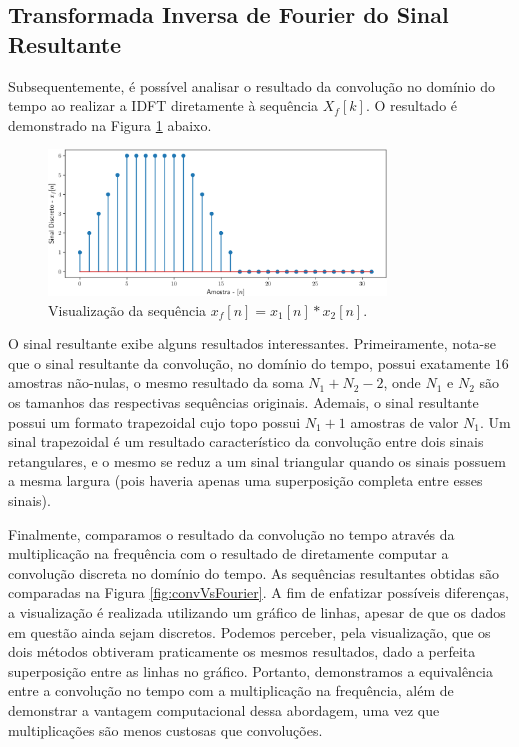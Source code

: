 \documentclass[a4paper,11pt]{article}
\numberwithin{figure}{section}
\numberwithin{equation}{section}
\numberwithin{table}{section}
\theoremstyle{definition}
\begin{document}
\subsection{Transformada Inversa de Fourier do Sinal Resultante}

Subsequentemente, é possível analisar o resultado da convolução no domínio do tempo ao realizar a IDFT diretamente à sequência $X_f[k]$. O resultado é demonstrado na Figura \ref{fig:trapez} abaixo.

\begin{figure}[ht] \centering
	\includegraphics[width=0.8\textwidth]{trapez}
	\caption{Visualização da sequência $x_f[n] = x_1[n] * x_2[n]$.}
	\label{fig:trapez}
\end{figure}

O sinal resultante exibe alguns resultados interessantes. Primeiramente, nota-se que o sinal resultante da convolução, no domínio do tempo, possui exatamente $16$ amostras não-nulas, o mesmo resultado da soma $N_1 + N_2 - 2$, onde $N_1$ e $N_2$ são os tamanhos das respectivas sequências originais. Ademais, o sinal resultante possui um formato trapezoidal cujo topo possui $N_1+1$ amostras de valor $N_1$. Um sinal trapezoidal é um resultado característico da convolução entre dois sinais retangulares, e o mesmo se reduz a um sinal triangular quando os sinais possuem a mesma largura (pois haveria apenas uma superposição completa entre esses sinais).

Finalmente, comparamos o resultado da convolução no tempo através da multiplicação na frequência com o resultado de diretamente computar a convolução discreta no domínio do tempo. As sequências resultantes obtidas são comparadas na Figura \ref{fig:convVsFourier}. A fim de enfatizar possíveis diferenças, a visualização é realizada utilizando um gráfico de linhas, apesar de que os dados em questão ainda sejam discretos. Podemos perceber, pela visualização, que os dois métodos obtiveram praticamente os mesmos resultados, dado a perfeita superposição entre as linhas no gráfico. Portanto, demonstramos a equivalência entre a convolução no tempo com a multiplicação na frequência, além de demonstrar a vantagem computacional dessa abordagem, uma vez que multiplicações são menos custosas que convoluções.
\end{document}
